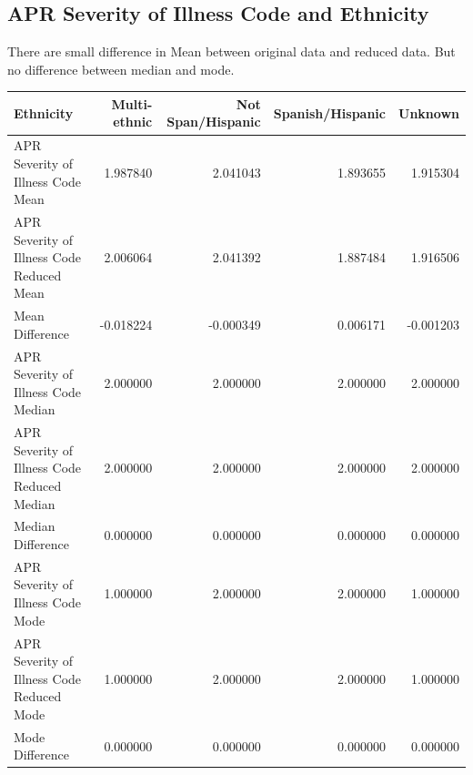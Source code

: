 \documentclass[
	letterpaper, %
]{jdf}
\begin{document}
\subsection{APR Severity of Illness Code and Ethnicity}
There are small difference in Mean between original data and reduced data. But no difference between median and mode.  
\begin{jdftable}
\label{table:Example}
\small %
\begin{tabular}{@{} lrrrr}
\textbf{Ethnicity} & \textbf{Multi-ethnic} &\textbf{Not Span/Hispanic} & \textbf{Spanish/Hispanic} &\textbf{Unknown}\\
	\toprule[0.5pt]
APR Severity of Illness Code Mean           &      1.987840 &           2.041043 &          1.893655 &  1.915304 \\ \midrule
APR Severity of Illness Code Reduced Mean   &      2.006064 &           2.041392 &          1.887484 &  1.916506 \\\midrule
Mean Difference                             &     -0.018224 &          -0.000349 &          0.006171 & -0.001203 \\\midrule
APR Severity of Illness Code Median         &      2.000000 &           2.000000 &          2.000000 &  2.000000 \\\midrule
APR Severity of Illness Code Reduced Median &      2.000000 &           2.000000 &          2.000000 &  2.000000 \\\midrule
Median Difference                           &      0.000000 &           0.000000 &          0.000000 &  0.000000 \\\midrule
APR Severity of Illness Code Mode           &      1.000000 &           2.000000 &          2.000000 &  1.000000 \\\midrule
APR Severity of Illness Code Reduced Mode   &      1.000000 &           2.000000 &          2.000000 &  1.000000 \\\midrule
Mode Difference                             &      0.000000 &           0.000000 &          0.000000 &  0.000000 \\
\end{tabular}
\end{jdftable}
\end{document}
